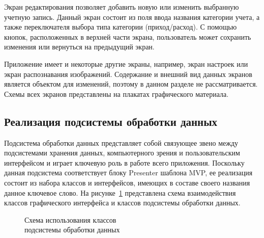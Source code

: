 Экран редактирования позволяет добавить новую или изменить выбранную
учетную запись. Данный экран состоит из поля ввода названия категории учета,
а также переключателя выбора типа категории (приход/расход).
С помощью кнопок, расположенных в верхней части экрана, пользователь
может сохранить изменения или вернуться на предыдущий экран.

Приложение имеет и некоторые другие экраны, например,
экран настроек или экран распознавания изображений.
Содержание и внешний вид данных экранов является объектом для
изменений, поэтому в данном разделе не рассматривается.
Схемы всех экранов представлены на плакатах графического материала.


\subsection{Реализация подсистемы обработки данных}
\label{subsec:implementation_bl}

Подсистема обработки данных представляет собой связующее звено
между подсистемами хранения данных, компьютерного зрения и
пользовательским интерфейсом и играет ключевую роль в работе всего приложения.
Поскольку данная подсистема соответствует блоку Presenter шаблона
MVP, ее реализация состоит из набора классов и интерфейсов,
имеющих в составе своего названия данное ключевое слово.
На рисунке~\ref{fig:implementation_bl_presenter} представлена схема взаимодействия
классов графического интерфейса и классов подсистемы обработки данных.

\begin{figure}[h!]
  \centering
  \caption{Схема использования классов \\ подсистемы обработки данных}
  \label{fig:implementation_bl_presenter}
\end{figure}

